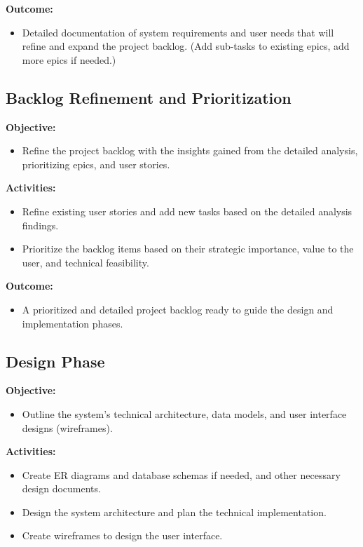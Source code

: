 \documentclass[12pt,a4paper]{article}
\begin{document}
\noindent \textbf{Outcome:}
\begin{itemize}
    \item Detailed documentation of system requirements and user needs that will refine and expand the project backlog. (Add sub-tasks to existing epics, add more epics if needed.)
\end{itemize}

\subsection{Backlog Refinement and Prioritization}

\noindent \textbf{Objective:}
\begin{itemize}
    \item Refine the project backlog with the insights gained from the detailed analysis, prioritizing epics, and user stories.
\end{itemize}

\noindent \textbf{Activities:}
\begin{itemize}
    \item Refine existing user stories and add new tasks based on the detailed analysis findings.
    \item Prioritize the backlog items based on their strategic importance, value to the user, and technical feasibility.
\end{itemize}

\noindent \textbf{Outcome:}
\begin{itemize}
    \item A prioritized and detailed project backlog ready to guide the design and implementation phases.
\end{itemize}

\subsection{Design Phase}

\noindent \textbf{Objective:}
\begin{itemize}
    \item Outline the system's technical architecture, data models, and user interface designs (wireframes).
\end{itemize}

\noindent \textbf{Activities:}
\begin{itemize}
    \item Create ER diagrams and database schemas if needed, and other necessary design documents.
    \item Design the system architecture and plan the technical implementation.
    \item Create wireframes to design the user interface.
\end{itemize}
\end{document}
